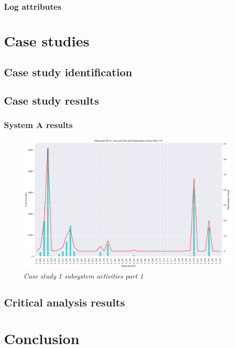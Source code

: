 \clearpage

\subsubsection{Log attributes}

\section{Case studies}

\subsection{Case study identification}

\subsection{Case study results}

\subsubsection{System A results}

\begin{landscape}
	\begin{figure}[!htb]
		\centering %
		\includegraphics[width=0.9\linewidth]{img/ch3/analysis/subsystems_1.pdf}
		\caption[Case study 1 subsystem activities part 1]
		{\textit{Case study 1 subsystem activities part 1}}\label{fig:ch3_saS1S24}
	\end{figure} 
\end{landscape}

\clearpage

\subsection{Critical analysis results}

\section{Conclusion}